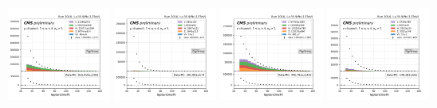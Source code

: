 \begin{figure}
    \centering
    \includegraphics[width=0.24\textwidth]{chapters/Appendix/sectionQCD/figures/123j1b/mu_leptonOnePt_True.png}
    \includegraphics[width=0.24\textwidth]{chapters/Appendix/sectionQCD/figures/123j1b/mu_leptonOnePt_False.png}
    \includegraphics[width=0.24\textwidth]{chapters/Appendix/sectionQCD/figures/123j1b/e_leptonOnePt_True.png}
    \includegraphics[width=0.24\textwidth]{chapters/Appendix/sectionQCD/figures/123j1b/e_leptonOnePt_False.png}
    

\end{figure}
